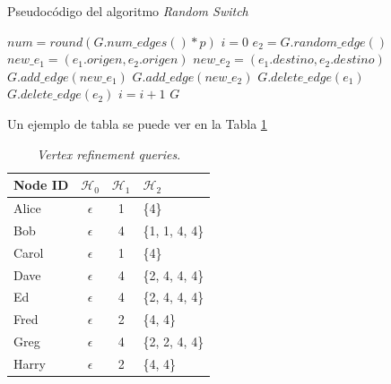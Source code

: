 \begin{algorithm}
	\caption{Pseudocódigo del algoritmo \textit{Random Switch}}
	\label{code:RandomSwitch-1}
	\begin{algorithmic}
		\STATE $num = round(G.num\_edges() * p)$
		\STATE $i = 0$
		\STATE $e_{2} = G.random\_edge()$
		\STATE $new\_e_{1} = (e_{1}.origen, e_{2}.origen)$
		\STATE $new\_e_{2} = (e_{1}.destino, e_{2}.destino)$
		\STATE $G.add\_edge(new\_e_{1})$
		\STATE $G.add\_edge(new\_e_{2})$
		\STATE $G.delete\_edge(e_{1})$
		\STATE $G.delete\_edge(e_{2})$
		\STATE $i=i+1$
		\ENDIF
		\ENDWHILE
		\RETURN $G$
	\end{algorithmic}
\end{algorithm}

Un ejemplo de tabla se puede ver en la Tabla \ref{table:ejemplo_vertex_refi_query}

\begin{table}
	\centering{}
	\begin{tabular}{ l || c | c | l }
		\hline
		Node ID & $\mathcal{H}_{0}$ & $\mathcal{H}_{1}$ & $\mathcal{H}_{2}$ \\
		\hline
		\hline
		Alice & $\epsilon$ & 1 & \{4\}  \\
		\hline
		Bob & $\epsilon$ & 4 & \{1, 1, 4, 4\}  \\
		\hline
		Carol & $\epsilon$ & 1 & \{4\}  \\
		\hline
		Dave & $\epsilon$ & 4 & \{2, 4, 4, 4\}  \\
		\hline
		Ed & $\epsilon$ & 4 & \{2, 4, 4, 4\}  \\
		\hline
		Fred & $\epsilon$ & 2 & \{4, 4\}  \\
		\hline
		Greg & $\epsilon$ & 4 & \{2, 2, 4, 4\}  \\
		\hline
		Harry & $\epsilon$ & 2 & \{4, 4\}  \\
		\hline
	\end{tabular}
	\caption{\textit{Vertex refinement queries}.}
	\label{table:ejemplo_vertex_refi_query}
\end{table}
\fi